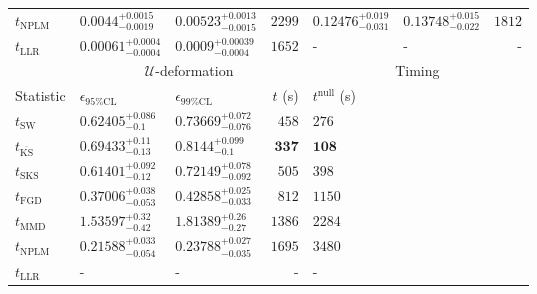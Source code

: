 \begin{tabular}{l|llr|llr}
\rowcolor{red!35}	$t_{\mathrm{NPLM}}$ & $0.0044_{-0.0019}^{+0.0015}$ & $0.00523_{-0.0015}^{+0.0013}$ & $2299$ & $0.12476_{-0.031}^{+0.019}$ & $0.13748_{-0.022}^{+0.015}$ & $1812$ \\
	$t_{\mathrm{LLR}}$ & $0.00061_{-0.0004}^{+0.0004}$ & $0.0009_{-0.0004}^{+0.00039}$ & $1652$ & - & - & - \\
	\toprule
	\multicolumn{1}{c}{} & \multicolumn{3}{c}{$\mathcal{U}$-deformation} & \multicolumn{3}{c}{Timing} \\
	Statistic & $\epsilon_{95\%\mathrm{CL}}$ & $\epsilon_{99\%\mathrm{CL}}$ & $t$ (s) & $t^{\mathrm{null}}$ (s) \\
	\midrule
	$t_{\mathrm{SW}}$ & $0.62405_{-0.1}^{+0.086}$ & $0.73669_{-0.076}^{+0.072}$ & $458$ & $276$ \\
	$t_{\overline{\mathrm{KS}}}$ & $0.69433_{-0.13}^{+0.11}$ & $0.8144_{-0.1}^{+0.099}$ & ${\mathbf{337}}$ & ${\mathbf{108}}$ \\
	$t_{\mathrm{SKS}}$ & $0.61401_{-0.12}^{+0.092}$ & $0.72149_{-0.092}^{+0.078}$ & $505$ & $398$ \\
	$t_{\mathrm{FGD}}$ & ${\mathbf{0.37006_{-0.053}^{+0.038}}}$ & ${\mathbf{0.42858_{-0.033}^{+0.025}}}$ & $812$ & $1150$ \\
	$t_{\mathrm{MMD}}$ & $1.53597_{-0.42}^{+0.32}$ & $1.81389_{-0.27}^{+0.26}$ & $1386$ & $2284$ \\
\rowcolor{red!35}	$t_{\mathrm{NPLM}}$ & $0.21588_{-0.054}^{+0.033}$ & $0.23788_{-0.035}^{+0.027}$ & $1695$ & $3480$ \\
	$t_{\mathrm{LLR}}$ & - & - & - & - \\
	\bottomrule
\end{tabular}